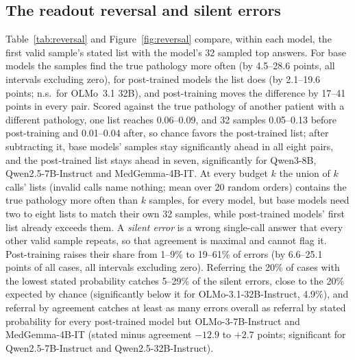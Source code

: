 \documentclass[wcp]{jmlr}
\begin{document}
\subsection{The readout reversal and silent errors}\label{sec:reversal}
Table~\ref{tab:reversal} and Figure~\ref{fig:reversal} compare, within each model, the first valid sample's stated list with the model's 32 sampled top answers. For base models the samples find the true pathology more often (by 4.5--28.6 points, all intervals excluding zero), for post-trained models the list does (by 2.1--19.6 points; n.s.\ for OLMo~3.1 32B), and post-training moves the difference by 17--41 points in every pair. Scored against the true pathology of another patient with a different pathology, one list reaches 0.06--0.09, and 32 samples 0.05--0.13 before post-training and 0.01--0.04 after, so chance favors the post-trained list; after subtracting it, base models' samples stay significantly ahead in all eight pairs, and the post-trained list stays ahead in seven, significantly for Qwen3-8B, Qwen2.5-7B-Instruct and MedGemma-4B-IT. At every budget $k$ the union of $k$ calls' lists (invalid calls name nothing; mean over 20 random orders) contains the true pathology more often than $k$ samples, for every model, but base models need two to eight lists to match their own 32 samples, while post-trained models' first list already exceeds them. A \emph{silent error} is a wrong single-call answer that every other valid sample repeats, so that agreement is maximal and cannot flag it. Post-training raises their share from 1--9\% to 19--61\% of errors (by 6.6--25.1 points of all cases, all intervals excluding zero). Referring the 20\% of cases with the lowest stated probability catches 5--29\% of the silent errors, close to the 20\% expected by chance (significantly below it for OLMo-3.1-32B-Instruct, 4.9\%), and referral by agreement catches at least as many errors overall as referral by stated probability for every post-trained model but OLMo-3-7B-Instruct and MedGemma-4B-IT (stated minus agreement $-12.9$ to $+2.7$ points; significant for Qwen2.5-7B-Instruct and Qwen2.5-32B-Instruct).
\end{document}
